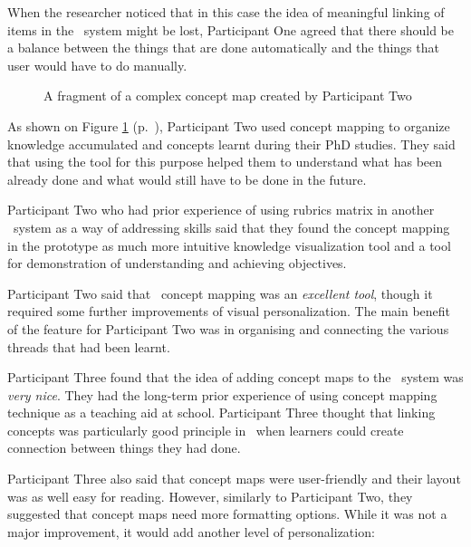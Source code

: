 When the researcher noticed that in this case the idea of meaningful linking of
items in the \ep~system might be lost, Participant One agreed that there should
be a balance between the things that are done automatically and the things that
user would have to do manually.

\begin{figure}[htb]
\centering
\setlength\fboxsep{0pt}
\setlength\fboxrule{0.5pt}
\caption{A fragment of a complex concept map created by Participant Two}
\label{fig:p2map}
\end{figure}

As shown on Figure \ref{fig:p2map} (p.~\pageref{fig:p2map}), Participant Two
used concept mapping to organize knowledge accumulated and concepts learnt during
their PhD studies. They said that using the tool for this purpose helped them to
understand what has been already done and what would still have to be done in
the future.

Participant Two who had prior experience of using rubrics matrix in another
\ep~system as a way of addressing \LLLs skills said that they found the concept
mapping in the prototype as much more intuitive knowledge visualization tool
and a tool for demonstration of understanding and achieving objectives.

Participant Two said that \ep~concept mapping was an \textit{excellent tool},
though it required some further improvements of visual personalization. The main
benefit of the feature for Participant Two was in organising and connecting the
various threads that had been learnt. 


Participant Three found that the idea of adding concept maps to the \ep~system
was \textit{very nice}. They had the long-term prior experience of using concept
mapping technique as a teaching aid at school. Participant Three thought that
linking concepts was particularly good principle in \ep~when learners could
create connection between things they had done.

Participant Three also said that concept maps were user-friendly and their
layout was as well easy for reading. However, similarly to Participant Two, they
suggested that concept maps need more formatting options. While it was not a
major improvement, it would add another level of personalization:

